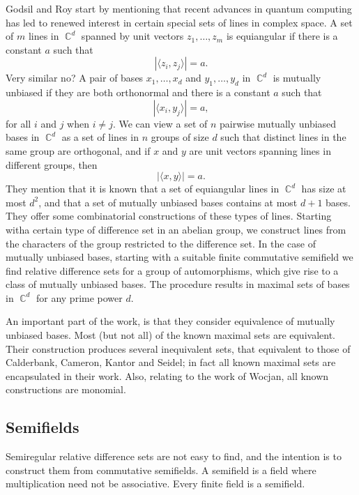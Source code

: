 \documentclass[a4paper]{article}
\DeclareMathOperator{\C}{\mathbb{C}}
\begin{document}
  Godsil and Roy start by mentioning that recent advances in
  quantum computing has led to renewed interest in certain
  special sets of lines in complex space. A set of $m$ 
  lines in $\C^{d}$ spanned by unit vectors $z_1,\ldots,z_m$ 
  is equiangular if there is a constant $a$ such that
  \[
    |\langle z_i, z_j \rangle| = a.
  \] 
  Very similar no? A pair of bases $x_1,\ldots,x_d$ and
  $y_1,\ldots,y_d$ in $\C^{d}$ is mutually unbiased if they
  are both orthonormal and there is a constant $a$ such that
  \[
    |\langle x_i, y_j \rangle| = a,
  \] 
  for all $i$ and $j$ when $i \neq j$. We can view a set of
  $n$ pairwise mutually unbiased bases in $\C^{d}$ as a set
  of lines in $n$ groups of size $d$ such that distinct
  lines in the same group are orthogonal, and if $x$ and $y$ 
  are unit vectors spanning lines in different groups, then
  \[
    |\langle x,y \rangle| = a.
  \] 
  They mention that it is known that a set of equiangular
  lines in $\C^{d}$ has size at most $d^2$, and that a set
  of mutually unbiased bases contains at most $d+1$ bases.
  They offer some combinatorial constructions of these types
  of lines. Starting witha  certain type of difference set
  in an abelian group, we construct lines from the
  characters of the group restricted to the difference set.
  In the case of mutually unbiased bases, starting with a
  suitable finite commutative semifield we find relative
  difference sets for a group of automorphisms, which give
  rise to a class of mutually unbiased bases. The procedure
  results in maximal sets of bases in $\C^{d}$ for any prime
  power $d$.

  An important part of the work, is that they consider
  equivalence of mutually unbiased bases. Most (but not all)
  of the known maximal sets are equivalent. Their
  construction produces several inequivalent sets, that
  equivalent to those of Calderbank, Cameron, Kantor and
  Seidel; in fact all known maximal sets are encapsulated in
  their work. Also, relating to the work of Wocjan, all
  known constructions are monomial.

  \subsection{Semifields}

  Semiregular relative difference sets are not easy to find,
  and the intention is to construct them from commutative
  semifields. A semifield is a field where multiplication
  need not be associative. Every finite field is a
  semifield. 
\end{document}
